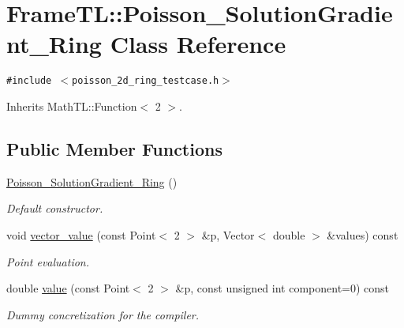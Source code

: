 \hypertarget{classFrameTL_1_1Poisson__SolutionGradient__Ring}{
\section{FrameTL::Poisson\_\-SolutionGradient\_\-Ring Class Reference}
\label{classFrameTL_1_1Poisson__SolutionGradient__Ring}
}
{\tt \#include $<$poisson\_\-2d\_\-ring\_\-testcase.h$>$}

Inherits MathTL::Function$<$ 2 $>$.

\subsection*{Public Member Functions}
\begin{CompactItemize}
\item 
\hypertarget{classFrameTL_1_1Poisson__SolutionGradient__Ring_fb73f6d089a77501101f71d4fd3f4f3e}{
\hyperlink{classFrameTL_1_1Poisson__SolutionGradient__Ring_fb73f6d089a77501101f71d4fd3f4f3e}{Poisson\_\-SolutionGradient\_\-Ring} ()}
\label{classFrameTL_1_1Poisson__SolutionGradient__Ring_fb73f6d089a77501101f71d4fd3f4f3e}

\begin{CompactList}\small\item\em Default constructor. \item\end{CompactList}\item 
\hypertarget{classFrameTL_1_1Poisson__SolutionGradient__Ring_61766e593c955c0cbe82853b333be951}{
void \hyperlink{classFrameTL_1_1Poisson__SolutionGradient__Ring_61766e593c955c0cbe82853b333be951}{vector\_\-value} (const Point$<$ 2 $>$ \&p, Vector$<$ double $>$ \&values) const }
\label{classFrameTL_1_1Poisson__SolutionGradient__Ring_61766e593c955c0cbe82853b333be951}

\begin{CompactList}\small\item\em Point evaluation. \item\end{CompactList}\item 
\hypertarget{classFrameTL_1_1Poisson__SolutionGradient__Ring_7dec31ebbc9bf605c9a2c6d35dee014a}{
double \hyperlink{classFrameTL_1_1Poisson__SolutionGradient__Ring_7dec31ebbc9bf605c9a2c6d35dee014a}{value} (const Point$<$ 2 $>$ \&p, const unsigned int component=0) const }
\label{classFrameTL_1_1Poisson__SolutionGradient__Ring_7dec31ebbc9bf605c9a2c6d35dee014a}

\begin{CompactList}\small\item\em Dummy concretization for the compiler. \item\end{CompactList}\end{CompactItemize}


